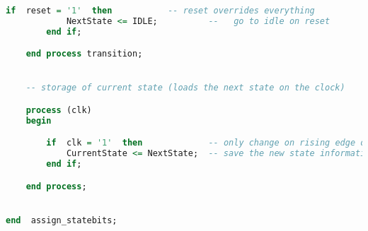 \begin{lstlisting}[language=vhdl]
        if  reset = '1'  then           -- reset overrides everything
            NextState <= IDLE;          --   go to idle on reset
        end if;

    end process transition;


    -- storage of current state (loads the next state on the clock)

    process (clk)
    begin

        if  clk = '1'  then             -- only change on rising edge of clock
            CurrentState <= NextState;  -- save the new state information
        end if;

    end process;


end  assign_statebits;
\end{lstlisting}